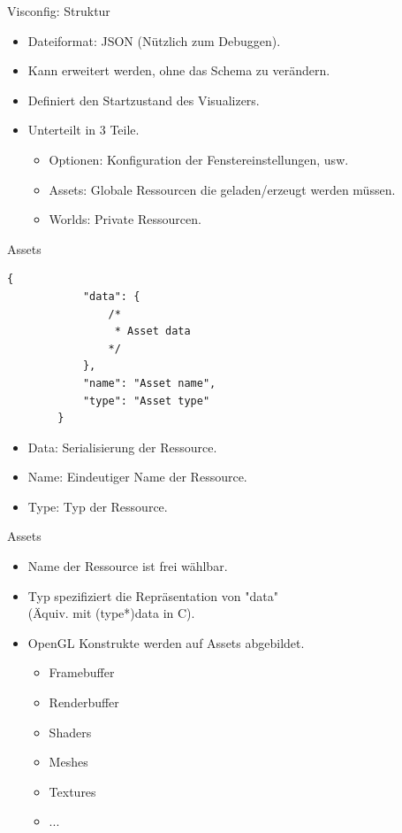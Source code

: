 \documentclass{presentation}
\begin{document}
\begin{frame}{Visconfig: Struktur}
    \begin{itemize}
        \item Dateiformat: JSON (Nützlich zum Debuggen).
        \item Kann erweitert werden, ohne das Schema zu verändern.
        \item Definiert den Startzustand des Visualizers.
        \item Unterteilt in 3 Teile.
        \begin{itemize}
            \item Optionen: Konfiguration der Fenstereinstellungen, usw.
            \item Assets: Globale Ressourcen die geladen/erzeugt werden müssen.
            \item Worlds: Private Ressourcen.
        \end{itemize}
    \end{itemize}
\end{frame}

\begin{frame}[fragile]{Assets}
    \begin{lstlisting}[style=context]
        {
            "data": {
                /*
                 * Asset data
                */
            },
            "name": "Asset name",
            "type": "Asset type"
        }
    \end{lstlisting}
    \begin{itemize}
        \item Data: Serialisierung der Ressource.
        \item Name: Eindeutiger Name der Ressource.
        \item Type: Typ der Ressource.
    \end{itemize}
\end{frame}

\begin{frame}{Assets}
    \begin{itemize}
        \item Name der Ressource ist frei wählbar.
        \item Typ spezifiziert die Repräsentation von "data"\\ (Äquiv. mit (type*)data in C).
        \item OpenGL Konstrukte werden auf Assets abgebildet.
        \begin{itemize}
            \item Framebuffer
            \item Renderbuffer
            \item Shaders
            \item Meshes
            \item Textures
            \item ...
        \end{itemize}
    \end{itemize}
\end{frame}
\end{document}
